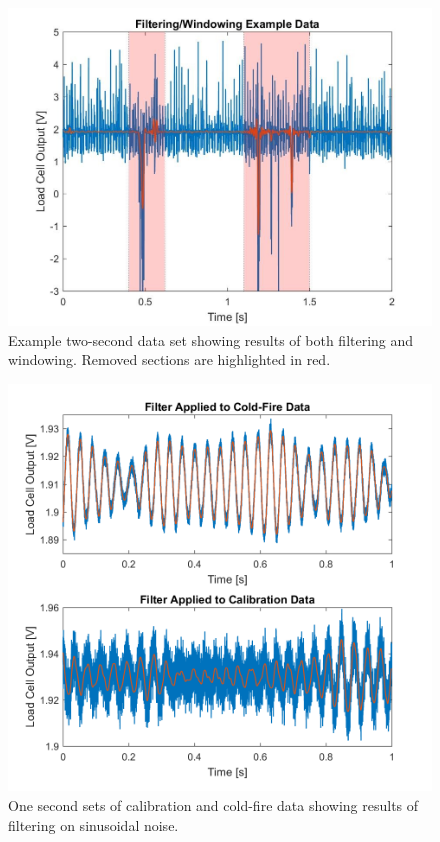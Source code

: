 \documentclass[conference]{IEEEtran}
\begin{document}
\begin{figure}
  \includegraphics[width=\linewidth]{figs/raw-data.jpg}
  \caption{Example two-second data set showing results of both filtering and windowing. Removed sections are highlighted in red.}
\label{fig:raw-data}
\end{figure}

\begin{figure}
  \includegraphics[width=\linewidth]{figs/other-raw-data.png}
  \caption{One second sets of calibration and cold-fire data showing results of filtering on sinusoidal noise.}
\label{fig:other-raw-data}
\end{figure}
\end{document}
